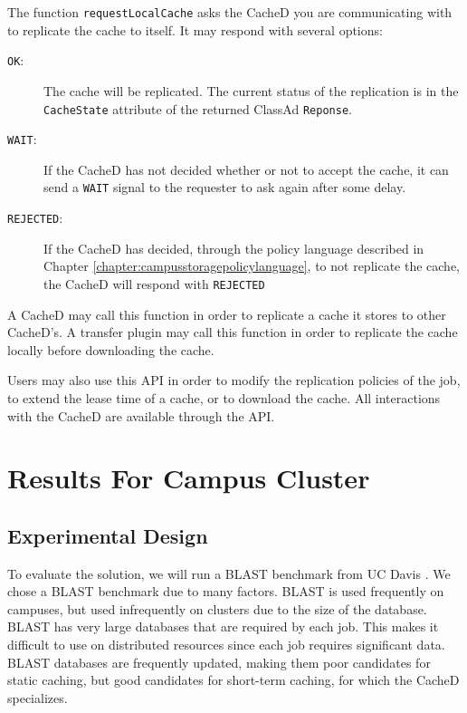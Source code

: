 The function \texttt{requestLocalCache} asks the CacheD you are communicating with to replicate the cache to itself.  It may respond with several options:

\begin{description}
	\item[\texttt{OK}:] The cache will be replicated.  The current status of the replication is in the \texttt{CacheState} attribute of the returned ClassAd \texttt{Reponse}.
	\item[\texttt{WAIT}:] If the CacheD has not decided whether or not to accept the cache, it can send a \texttt{WAIT} signal to the requester to ask again after some delay.
	\item[\texttt{REJECTED}:] If the CacheD has decided, through the policy language described in Chapter \ref{chapter:campusstoragepolicylanguage}, to not replicate the cache, the CacheD will respond with \texttt{REJECTED}
\end{description}

A CacheD may call this function in order to replicate a cache it stores to other CacheD's.  A transfer plugin may call this function in order to replicate the cache locally before downloading the cache.

Users may also use this API in order to modify the replication policies of the job, to extend the lease time of a cache, or to download the cache.  All interactions with the CacheD are available through the API.




\section{Results For Campus Cluster}

\subsection{Experimental Design}
To evaluate the solution, we will run a BLAST benchmark from UC Davis \cite{blastbenchmark}.  We chose a BLAST benchmark due to many factors.  BLAST is used frequently on campuses, but used infrequently on clusters due to the size of the database. BLAST has very large databases that are required by each job.  This makes it difficult to use on distributed resources since each job requires significant data.
BLAST databases are frequently updated, making them poor candidates for static caching, but good candidates for short-term caching, for which the CacheD specializes.

